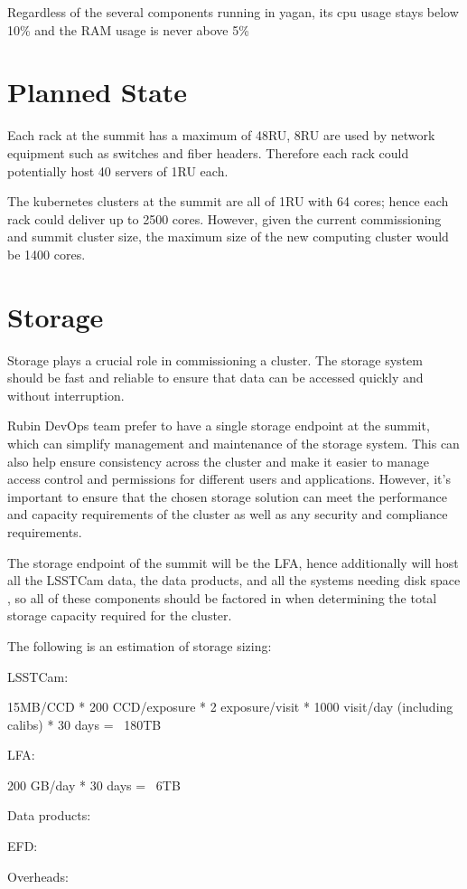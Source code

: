 Regardless of the several components running in yagan, its cpu usage stays below 10\% and the RAM usage is never above 5\%


\section{Planned State}

Each rack at the summit has a maximum of 48RU, 8RU are used by network equipment such as switches and fiber headers. Therefore each rack could potentially host 40 servers of 1RU each.

The kubernetes clusters at the summit are all of 1RU with 64 cores; hence each rack could deliver up to 2500 cores. However, given the current commissioning and summit cluster size, the maximum size of the new computing cluster would be 1400 cores. 

\section{Storage}

Storage plays a crucial role in commissioning a cluster. The storage system should be fast and reliable to ensure that data can be accessed quickly and without interruption.

Rubin DevOps team prefer to have a single storage endpoint at the summit, which can simplify management and maintenance of the storage system. This can also help ensure consistency across the cluster and make it easier to manage access control and permissions for different users and applications. However, it's important to ensure that the chosen storage solution can meet the performance and capacity requirements of the cluster as well as any security and compliance requirements. 

The storage endpoint of the summit will be the LFA, hence additionally will host all the LSSTCam data, the data products, and all the systems needing disk space , so all of these components should be factored in when determining the total storage capacity required for the cluster.

The following is an estimation of storage sizing:

LSSTCam:

15MB/CCD * 200 CCD/exposure * 2 exposure/visit * 1000 visit/day (including calibs) * 30 days = ~180TB

LFA:

200 GB/day * 30 days = ~6TB

Data products:



EFD:



Overheads: